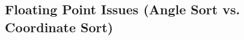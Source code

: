 \subsection{Floating Point Issues (Angle Sort vs. Coordinate Sort)}
\label{ssec:D.3.3}
\lipsum[18] %